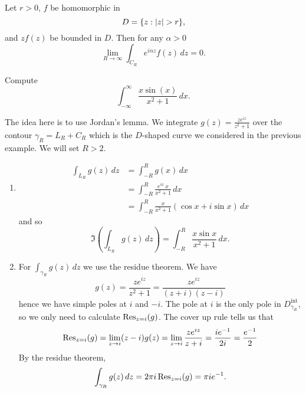 
\begin{lemma}
    Let $r > 0$, 
    $f$ be homomorphic in 
    \[
        D = \{z: \left\lvert z\right\rvert > r\},
    \]
    and $z f(z)$ be bounded in $D$.
    Then for any $\alpha > 0$
    \[
        \lim_{R \to \infty} \int_{C_R} e^{i\alpha z} f(z) \,dz = 0.
    \]
\end{lemma}

\begin{example}
    Compute
    \[
        \int_{-\infty}^{\infty} \frac{x \sin(x)}{x^2 + 1} \,dx.
    \]
\end{example}

\begin{solution}
    The idea here is to use Jordan's lemma. 
    We integrate
    $
        g(z) = \frac{z e^{iz}}{z^2 + 1} 
    $
    over the contour $\gamma_R = L_R + C_R$
    which is the $D$-shaped curve we considered in the previous example. %
    We will set $R > 2$.
    \begin{enumerate}
        \item 
            \hfill
            \begin{align*}
                \int_{L_R} g(z) \,dz
                &= \int_{-R}^{R} g(x) \,dx \\
                &= \int_{-R}^{R} \frac{e^{ix} \, x}{x^2 + 1} \,dx \\
                &= \int_{-R}^{R} \frac{x}{x^2 + 1} (\cos x + i\sin x) \, dx 
            \end{align*}
            and so 
            \[
                \Im\left(\int_{L_R} g(z) \,dz\right) = \int_{-R}^{R} \frac{x\sin x}{x^2 + 1} \,dx.
            \]

        \item 
            For $\int_{\gamma_R} g(z) \,dz$ we use the residue theorem.
            We have
            \[
                g(z) = \frac{z e^{iz}}{z^2 + 1} = \frac{ze^{iz}}{(z + i)(z - i)}
            \]
            hence we have simple poles at $i$ and $-i$.
            The pole at $i$ is the only pole in 
            $D_{\gamma_R}^{\text{int}}$, 
            so we only need to calculate
            $\operatorname{Res}_{z = i} (g)$.
            The cover up rule tells us that
            \[ 
                \operatorname{Res}_{z = i} (g) 
                = \lim_{z \to i} (z-i)g(z) 
                = \lim_{z \to i} \frac{ze^{iz}}{z+i} 
                = \frac{ie^{-1}}{2i} 
                = \frac{e^{-1}}{2} 
            \]
            By the residue theorem,
            \[
                \int_{\gamma_R} g(z) \,dz = 2\pi i \operatorname{Res}_{z=i} (g) = \pi i e^{-1}.
            \]


\end{enumerate}
\end{solution}

